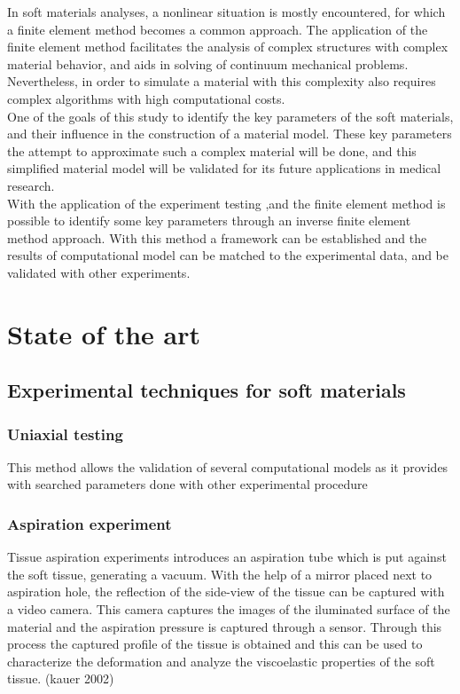 In soft materials analyses, a nonlinear situation is mostly encountered, for which a finite 
element method becomes a common approach. The application of the finite element method
 facilitates the analysis of complex structures with complex material behavior, and aids in 
 solving of continuum mechanical problems. Nevertheless, in order to simulate a material with 
 this complexity also requires complex algorithms with high computational costs. \\
 
One of the goals of this study to identify the key parameters of the soft materials, and their 
influence in the construction of a material model. These key parameters the attempt to 
 approximate such a complex material will be done, and this simplified material model will be 
 validated for its future applications in medical research.\\
 
 With the application of the experiment testing ,and the finite element method is possible 
 to identify some key parameters through an inverse finite element method approach. With this 
 method a framework can be established and the results of computational model can be matched 
 to the experimental data, and be validated with other experiments.

\section{State of the art}

\subsection{Experimental techniques for soft materials}
\subsubsection{Uniaxial testing}
This method allows the validation of several computational models as it provides with
 searched parameters done with other experimental procedure

\subsubsection{Aspiration experiment}

Tissue aspiration experiments introduces an aspiration tube which is put against the 
soft tissue, generating a vacuum. With the help of a mirror placed next to aspiration 
hole, the reflection of the side-view of the tissue can be captured with a video camera.
This camera captures the images of the iluminated surface of the material and the 
aspiration pressure is captured through a sensor. Through this process the captured 
profile of the tissue is obtained and this can be used to characterize the deformation 
and analyze the viscoelastic properties of the soft tissue. (kauer 2002)

